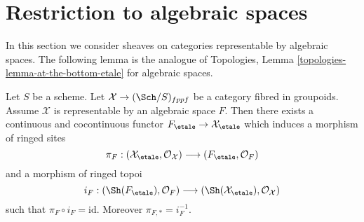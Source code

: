 \section{Restriction to algebraic spaces}
\label{section-restriction-algebraic-spaces}

\noindent
In this section we consider sheaves on categories representable by
algebraic spaces. The following lemma is the analogue of
Topologies, Lemma \ref{topologies-lemma-at-the-bottom-etale}
for algebraic spaces.

\begin{lemma}
\label{lemma-compare}
Let $S$ be a scheme. Let $\mathcal{X} \to (\Sch/S)_{fppf}$ be a category
fibred in groupoids. Assume $\mathcal{X}$ is representable by an algebraic
space $F$. Then there exists a continuous and cocontinuous functor
$
F_\etale \to \mathcal{X}_\etale
$
which induces a morphism of ringed sites
$$
\pi_F :
(\mathcal{X}_\etale, \mathcal{O}_\mathcal{X})
\longrightarrow
(F_\etale, \mathcal{O}_F)
$$
and a morphism of ringed topoi
$$
i_F :
(\Sh(F_\etale), \mathcal{O}_F)
\longrightarrow
(\Sh(\mathcal{X}_\etale), \mathcal{O}_\mathcal{X})
$$
such that $\pi_F \circ i_F = \text{id}$. Moreover $\pi_{F, *} = i_F^{-1}$.
\end{lemma}

